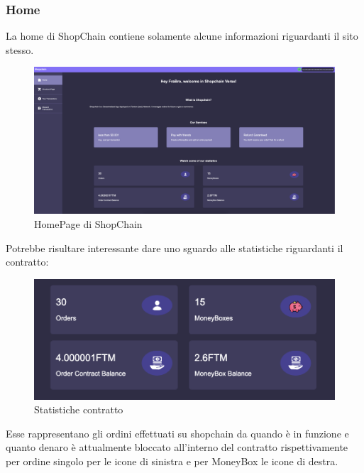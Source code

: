         \subsubsection{Home}
        La home di ShopChain contiene solamente alcune informazioni riguardanti il sito stesso.
        \begin{figure}[H]
            \centering
            \includegraphics[scale=0.2]{immagini/Home.png}
            \caption{HomePage di ShopChain}
        \end{figure}
        Potrebbe risultare interessante dare uno sguardo alle statistiche riguardanti il contratto:
        \begin{figure}[H]
            \centering
            \includegraphics[scale=0.4]{immagini/ContractDetails.png}
            \caption{Statistiche contratto}
        \end{figure}

        Esse rappresentano gli ordini effettuati su shopchain da quando è in funzione e quanto denaro è attualmente bloccato all'interno del contratto rispettivamente per ordine singolo per le icone di sinistra e per MoneyBox le icone di destra.

